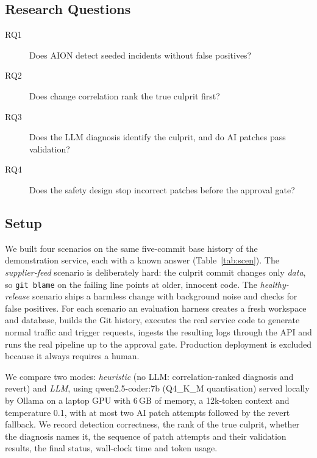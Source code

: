 \documentclass[conference]{IEEEtran}
\begin{document}
\subsection{Research Questions}
\begin{description}
\item[RQ1] Does AION detect seeded incidents without false positives?
\item[RQ2] Does change correlation rank the true culprit first?
\item[RQ3] Does the LLM diagnosis identify the culprit, and do AI patches pass validation?
\item[RQ4] Does the safety design stop incorrect patches before the approval gate?
\end{description}

\subsection{Setup}
We built four scenarios on the same five-commit base history of the demonstration service, each with a known answer (Table~\ref{tab:scen}). The \emph{supplier-feed} scenario is deliberately hard: the culprit commit changes only \emph{data}, so \texttt{git blame} on the failing line points at older, innocent code. The \emph{healthy-release} scenario ships a harmless change with background noise and checks for false positives. For each scenario an evaluation harness creates a fresh workspace and database, builds the Git history, executes the real service code to generate normal traffic and trigger requests, ingests the resulting logs through the API and runs the real pipeline up to the approval gate. Production deployment is excluded because it always requires a human.

We compare two modes: \emph{heuristic} (no LLM: correlation-ranked diagnosis and revert) and \emph{LLM}, using qwen2.5-coder:7b (Q4\_K\_M quantisation) served locally by Ollama on a laptop GPU with 6\,GB of memory, a 12k-token context and temperature 0.1, with at most two AI patch attempts followed by the revert fallback. We record detection correctness, the rank of the true culprit, whether the diagnosis names it, the sequence of patch attempts and their validation results, the final status, wall-clock time and token usage.
\end{document}
